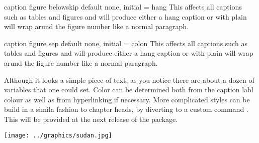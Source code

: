 \begin{docKey}{caption figure belowskip}{ } {default none, initial = hang}
  This affects all captions such as tables and figures and will produce either 
  a hang caption or   with plain will wrap arund the figure number like a normal paragraph.
\end{docKey}

\begin{docKey}{caption figure sep}{ } {default none, initial = colon}
  This affects all captions such as tables and figures and will produce either 
  a hang caption or   with plain will wrap arund the figure number like a normal paragraph.
\end{docKey}
%
%


Although it looks a simple piece of text, as you notice there are about
a dozen of variables that one could set. Color can be determined both
from the caption labl colour as well as from hyperlinking if necessary.
More complicated styles can be build in a simila fashion to chapter
heads, by diverting to a custom command . This
will be provided at the next release of the package.




\begin{texexample}{}{}
\bgroup
{}
\texttt{[image: ../graphics/sudan.jpg]}
\egroup

\bgroup
{}
\egroup
\end{texexample}

